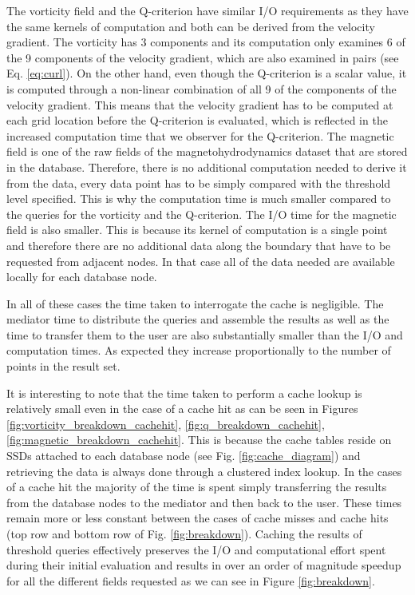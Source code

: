 \documentclass{sig-alternate}
\begin{document}
The vorticity field and the Q-criterion have similar I/O requirements as they
have the same kernels of computation and both can be derived from the velocity gradient. The vorticity has 3 components and its computation only examines
6 of the 9 components of the velocity gradient, which are also examined in pairs (see Eq. \ref{eq:curl}). On the other hand, even though the Q-criterion is a
scalar value, it is computed through a non-linear combination of all 9 of the components of the velocity gradient. This means that the velocity gradient has
to be computed at each grid location before the Q-criterion is evaluated, which is reflected in the increased computation time that we observer for the
Q-criterion. The magnetic field is one of the raw fields of the magnetohydrodynamics dataset that are stored in the database. Therefore, there is no
additional computation needed to derive it from the data, every data point has to be simply compared with the threshold level specified. This is why the 
computation time is much smaller compared to the queries for the vorticity and the Q-criterion. The I/O time for the magnetic field is also smaller. This is
because its kernel of computation is a single point and therefore there are no additional data along the boundary that have to be requested from adjacent 
nodes. In that case all of the data needed are available locally for each database node.

In all of these cases the time taken to interrogate the cache is negligible. The mediator time to distribute the queries and assemble the results as well as the
time to transfer them to the user are also substantially smaller than the I/O and computation times. As expected they increase proportionally to the number
of points in the result set.

It is interesting to note that the time taken to perform a cache lookup is relatively small even in the case of a cache hit as can be seen in Figures 
\ref{fig:vorticity_breakdown_cachehit}, \ref{fig:q_breakdown_cachehit}, \ref{fig:magnetic_breakdown_cachehit}. This is because the cache tables reside on
SSDs attached to each database node (see Fig. \ref{fig:cache_diagram}) and retrieving the data is always done through a clustered index lookup.
In the cases of a cache hit the majority of the time is spent simply transferring the results from the database nodes to the mediator and then back to the user.
These times remain more or less constant between the cases of cache misses and cache hits (top row and bottom row of Fig. \ref{fig:breakdown}).
Caching the results of threshold queries
effectively preserves the I/O and computational effort spent during their initial evaluation and results in over an order of magnitude speedup for all the
different fields requested as we can see in Figure \ref{fig:breakdown}.
\end{document}
